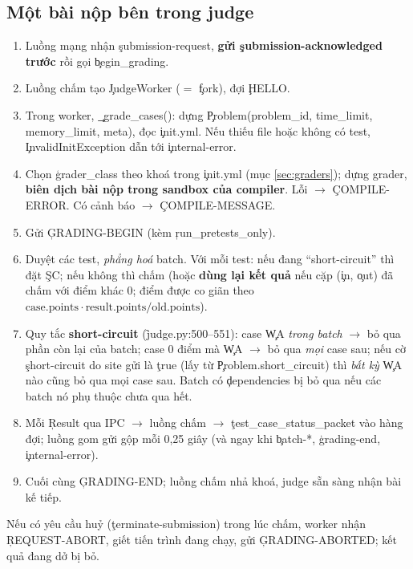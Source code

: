 \subsection{Một bài nộp bên trong judge}
\begin{enumerate}
\item Luồng mạng nhận \c{submission-request}, \textbf{gửi \c{submission-acknowledged} trước} rồi gọi \c{begin_grading}.
\item Luồng chấm tạo \c{JudgeWorker} ($=$ \c{fork}), đợi \c{HELLO}.
\item Trong worker, \c{_grade_cases()}: dựng \c{Problem(problem_id, time_limit, memory_limit, meta)}, đọc \c{init.yml}. Nếu thiếu file hoặc không có test, \c{InvalidInitException} dẫn tới \c{internal-error}.
\item Chọn \c{grader_class} theo khoá trong \c{init.yml} (mục \ref{sec:graders}); dựng grader, \textbf{biên dịch bài nộp trong sandbox của compiler}. Lỗi $\to$ \c{COMPILE-ERROR}. Có cảnh báo $\to$ \c{COMPILE-MESSAGE}.
\item Gửi \c{GRADING-BEGIN} (kèm \c{run_pretests_only}).
\item Duyệt các test, \emph{phẳng hoá} batch. Với mỗi test: nếu đang ``short-circuit'' thì đặt \c{SC}; nếu không thì chấm (hoặc \textbf{dùng lại kết quả} nếu cặp (\c{in}, \c{out}) đã chấm với điểm khác 0; điểm được co giãn theo $\text{case.points}\cdot \text{result.points}/\text{old.points}$).
\item Quy tắc \textbf{short-circuit} (\f{judge.py:500--551}): case \c{WA} \emph{trong batch} $\to$ bỏ qua phần còn lại của batch; case 0 điểm mà \c{WA} $\to$ bỏ qua \emph{mọi} case sau; nếu cờ \c{short-circuit} do site gửi là \c{true} (lấy từ \c{Problem.short_circuit}) thì \emph{bất kỳ} \c{WA} nào cũng bỏ qua mọi case sau. Batch có \c{dependencies} bị bỏ qua nếu các batch nó phụ thuộc chưa qua hết.
\item Mỗi \c{Result} qua IPC $\to$ luồng chấm $\to$ \c{test_case_status_packet} vào hàng đợi; luồng gom gửi gộp mỗi 0,25 giây (và ngay khi \c{batch-*}, \c{grading-end}, \c{internal-error}).
\item Cuối cùng \c{GRADING-END}; luồng chấm nhả khoá, judge sẵn sàng nhận bài kế tiếp.
\end{enumerate}
Nếu có yêu cầu huỷ (\c{terminate-submission}) trong lúc chấm, worker nhận \c{REQUEST-ABORT}, giết tiến trình đang chạy, gửi \c{GRADING-ABORTED}; kết quả đang dở bị bỏ. \tS

